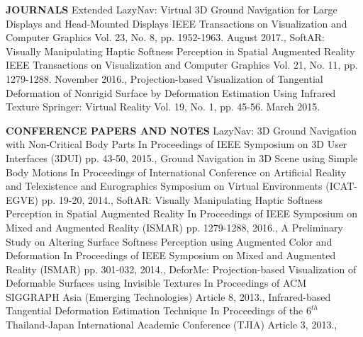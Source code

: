 \documentclass[11pt]{article} %
\begin{document}
\pagebreak


\textbf{JOURNALS}
\publicationthelist
{
				{Extended LazyNav: Virtual 3D Ground Navigation for Large Displays and Head-Mounted Displays}
				{IEEE Transactions on Visualization and Computer Graphics}
				{Vol. 23, No. 8, pp. 1952-1963.}
				{August 2017.},
				{SoftAR: Visually Manipulating Haptic Softness Perception in Spatial Augmented Reality}
				{IEEE Transactions on Visualization and Computer Graphics}
				{Vol. 21, No. 11, pp. 1279-1288.}
				{November 2016.},
				{Projection-based Visualization of Tangential Deformation of Nonrigid Surface by Deformation Estimation Using Infrared Texture}
				{Springer: Virtual Reality}
				{Vol. 19, No. 1, pp. 45-56.}
				{March 2015.}
}

\textbf{CONFERENCE PAPERS AND NOTES}
\publicationthelist
{
	{LazyNav: 3D Ground Navigation with Non-Critical Body Parts}
	{In Proceedings of IEEE Symposium on 3D User Interfaces (3DUI)}
	{pp. 43-50,}
	{2015.},
	{Ground Navigation in 3D Scene using Simple Body Motions}
	{In Proceedings of International Conference on Artificial Reality and Telexistence and Eurographics Symposium on Virtual Environments (ICAT-EGVE)}
	{pp. 19-20,}
	{2014.},
	{SoftAR: Visually Manipulating Haptic Softness Perception in Spatial Augmented Reality}
	{In Proceedings of IEEE Symposium on Mixed and Augmented Reality (ISMAR)}
	{pp. 1279-1288,}
	{2016.},
	{A Preliminary Study on Altering Surface Softness Perception using Augmented Color and Deformation}
	{In Proceedings of IEEE Symposium on Mixed and Augmented Reality (ISMAR)}
	{pp. 301-032,}
	{2014.},
	{DeforMe: Projection-based Visualization of Deformable Surfaces using Invisible Textures}
	{In Proceedings of ACM SIGGRAPH Asia (Emerging Technologies)}
	{Article 8,}
	{2013.},
	{Infrared-based Tangential Deformation Estimation Technique}
	{In Proceedings of the $6^{th}$ Thailand-Japan International Academic Conference (TJIA)}
	{Article 3,}
	{2013.},
}
\end{document}
